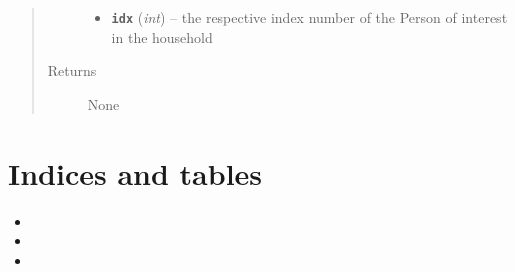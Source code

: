 \documentclass[letterpaper,10pt,english]{sphinxmanual}
\begin{document}
\begin{fulllineitems}
\begin{fulllineitems}
\begin{quote}
\begin{description}
\begin{itemize}
\item {} 
\textbf{\texttt{idx}} (\emph{int}) -- the respective index number of the Person of interest in the household

\end{itemize}

\item[{Returns}] \leavevmode
None

\end{description}\end{quote}

\end{fulllineitems}


\end{fulllineitems}



\chapter{Indices and tables}
\label{index:indices-and-tables}\begin{itemize}
\item {} 

\item {} 

\item {} 

\end{itemize}
\end{document}
